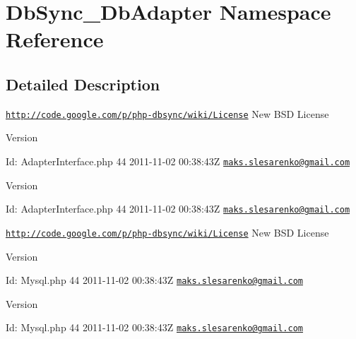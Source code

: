 \hypertarget{namespaceDbSync__DbAdapter}{
\section{DbSync\_\-DbAdapter Namespace Reference}
\label{namespaceDbSync__DbAdapter}
}


\subsection{Detailed Description}
\href{http://code.google.com/p/php-dbsync/wiki/License}{\tt http://code.google.com/p/php-\/dbsync/wiki/License} New BSD License \begin{DoxyVersion}{Version}

\end{DoxyVersion}
\begin{DoxyParagraph}{Id:}
AdapterInterface.php 44 2011-\/11-\/02 00:38:43Z \href{mailto:maks.slesarenko@gmail.com}{\tt maks.slesarenko@gmail.com} 
\end{DoxyParagraph}


\begin{DoxyVersion}{Version}

\end{DoxyVersion}
\begin{DoxyParagraph}{Id:}
AdapterInterface.php 44 2011-\/11-\/02 00:38:43Z \href{mailto:maks.slesarenko@gmail.com}{\tt maks.slesarenko@gmail.com} 
\end{DoxyParagraph}


\href{http://code.google.com/p/php-dbsync/wiki/License}{\tt http://code.google.com/p/php-\/dbsync/wiki/License} New BSD License \begin{DoxyVersion}{Version}

\end{DoxyVersion}
\begin{DoxyParagraph}{Id:}
Mysql.php 44 2011-\/11-\/02 00:38:43Z \href{mailto:maks.slesarenko@gmail.com}{\tt maks.slesarenko@gmail.com} 
\end{DoxyParagraph}


\begin{DoxyVersion}{Version}

\end{DoxyVersion}
\begin{DoxyParagraph}{Id:}
Mysql.php 44 2011-\/11-\/02 00:38:43Z \href{mailto:maks.slesarenko@gmail.com}{\tt maks.slesarenko@gmail.com} 
\end{DoxyParagraph}
